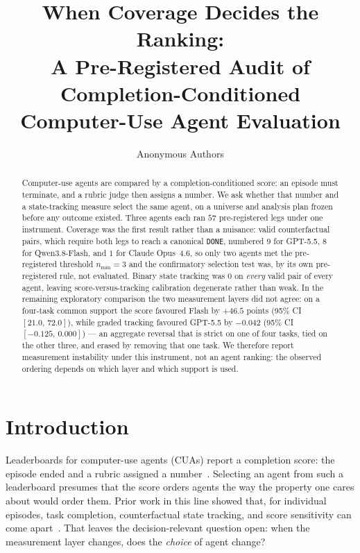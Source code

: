 \documentclass{article}
\title{When Coverage Decides the Ranking:\\
A Pre-Registered Audit of Completion-Conditioned\\
Computer-Use Agent Evaluation}
\author{Anonymous Authors}
\begin{document}
\maketitle

\begin{abstract}
Computer-use agents are compared by a completion-conditioned score: an episode must terminate, and a rubric judge then assigns a number.
We ask whether that number and a state-tracking measure select the same agent, on a universe and analysis plan frozen before any outcome existed.
Three agents each ran $57$ pre-registered legs under one instrument.
Coverage was the first result rather than a nuisance: valid counterfactual pairs, which require both legs to reach a canonical \texttt{DONE}, numbered $9$ for GPT-5.5, $8$ for Qwen3.8-Flash, and $1$ for Claude Opus~4.6, so only two agents met the pre-registered threshold $n_{\min}=3$ and the confirmatory selection test was, by its own pre-registered rule, not evaluated.
Binary state tracking was $0$ on \emph{every} valid pair of every agent, leaving score-versus-tracking calibration degenerate rather than weak.
In the remaining exploratory comparison the two measurement layers did not agree: on a four-task common support the score favoured Flash by $+46.5$ points (95\% CI $[21.0,\,72.0]$), while graded tracking favoured GPT-5.5 by $-0.042$ (95\% CI $[-0.125,\,0.000]$) --- an aggregate reversal that is strict on one of four tasks, tied on the other three, and erased by removing that one task.
We therefore report measurement instability under this instrument, not an agent ranking: the observed ordering depends on which layer and which support is used.
\end{abstract}

\section{Introduction}

Leaderboards for computer-use agents (CUAs) report a completion score: the episode ended and a rubric assigned a number~\citep{jang2026mypcbench,xie2024osworld}.
Selecting an agent from such a leaderboard presumes that the score orders agents the way the property one cares about would order them.
Prior work in this line showed that, for individual episodes, task completion, counterfactual state tracking, and score sensitivity can come apart~\citep{shao2026protocolvalidity,turk2026counterfactualclinical}.
That leaves the decision-relevant question open: when the measurement layer changes, does the \emph{choice} of agent change?
\end{document}
